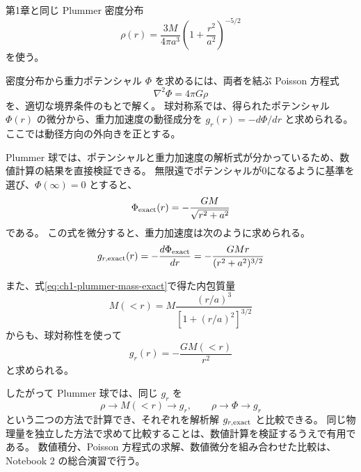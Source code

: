 第1章と同じ Plummer 密度分布
\begin{equation}
 \rho(r)=\frac{3M}{4\pi a^3}\left(1+\frac{r^2}{a^2}\right)^{-5/2}
\label{eq:ch2-plummer-density}
\end{equation}
を使う\cite{ryden2025}。

密度分布から重力ポテンシャル $\Phi$ を求めるには、両者を結ぶ Poisson 方程式
\begin{equation}
 \nabla^2\Phi=4\pi G\rho
\end{equation}
を、適切な境界条件のもとで解く。
球対称系では、得られたポテンシャル $\Phi(r)$ の微分から、重力加速度の動径成分を $g_r(r)=-d\Phi/dr$ と求められる。
ここでは動径方向の外向きを正とする。

Plummer 球では、ポテンシャルと重力加速度の解析式が分かっているため、数値計算の結果を直接検証できる。
無限遠でポテンシャルが0になるように基準を選び、$\Phi(\infty)=0$ とすると、
\begin{equation}
 \Phi_{\rm exact}(r)=-\frac{GM}{\sqrt{r^2+a^2}}
\label{eq:ch2-plummer-potential}
\end{equation}
である。
この式を微分すると、重力加速度は次のように求められる。
\begin{equation}
 g_{r,\rm exact}(r)=-\frac{d\Phi_{\rm exact}}{dr}=-\frac{GMr}{(r^2+a^2)^{3/2}}
\label{eq:ch2-plummer-gravity}
\end{equation}

また、式\eqref{eq:ch1-plummer-mass-exact}で得た内包質量
\begin{equation}
 M(<r)
 =M\frac{(r/a)^3}{[1+(r/a)^2]^{3/2}}
\label{eq:ch2-plummer-mass}
\end{equation}
からも、球対称性を使って
\begin{equation}
 g_r(r)=-\frac{GM(<r)}{r^2}
\label{eq:ch2-gravity-from-mass}
\end{equation}
と求められる。

したがって Plummer 球では、同じ $g_r$ を
\begin{equation}
 \rho\rightarrow M(<r)\rightarrow g_r,
 \qquad
 \rho\rightarrow\Phi\rightarrow g_r
\label{eq:ch2-three-routes}
\end{equation}
という二つの方法で計算でき、それぞれを解析解 $g_{r,\rm exact}$ と比較できる。
同じ物理量を独立した方法で求めて比較することは、数値計算を検証するうえで有用である。
数値積分、Poisson 方程式の求解、数値微分を組み合わせた比較は、Notebook 2 の総合演習で行う。


